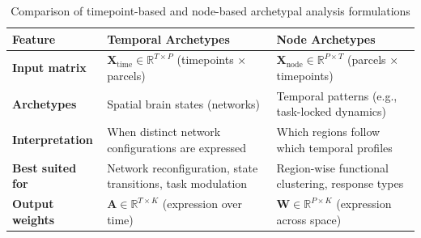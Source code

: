 \documentclass[12pt]{article}
\begin{document}
\begin{table}[h!]
\centering
\caption{Comparison of timepoint-based and node-based archetypal analysis formulations}
\begin{tabular}{|p{4cm}|p{5.5cm}|p{5.5cm}|}
\hline
\textbf{Feature} & \textbf{Temporal Archetypes} & \textbf{Node Archetypes} \\
\hline
\textbf{Input matrix} & $\mathbf{X}_{\text{time}} \in \mathbb{R}^{T \times P}$ (timepoints × parcels) & $\mathbf{X}_{\text{node}} \in \mathbb{R}^{P \times T}$ (parcels × timepoints) \\
\hline
\textbf{Archetypes} & Spatial brain states (networks) & Temporal patterns (e.g., task-locked dynamics) \\
\hline
\textbf{Interpretation} & When distinct network configurations are expressed & Which regions follow which temporal profiles \\
\hline
\textbf{Best suited for} & Network reconfiguration, state transitions, task modulation & Region-wise functional clustering, response types \\
\hline
\textbf{Output weights} & $\mathbf{A} \in \mathbb{R}^{T \times K}$ (expression over time) & $\mathbf{W} \in \mathbb{R}^{P \times K}$ (expression across space) \\
\hline
\end{tabular}
\end{table}









\end{document}
